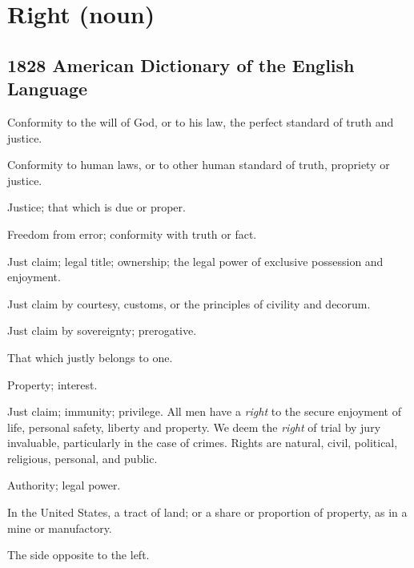 \section{Right (noun)}
	\label{RIGHT-NOUN}
	

\subsection{1828 American Dictionary of the English Language} %
	\label{RIGHT-NOUN-1828}

	\begin{compactitem}
		\item[1] Conformity to the will of God, or to his law, the perfect standard of truth and justice.
		\item[2] Conformity to human laws, or to other human standard of truth, propriety or justice.
		\item[3] Justice; that which is due or proper.
		\item[4] Freedom from error; conformity with truth or fact.
		\item[5] Just claim; legal title; ownership; the legal power of exclusive possession and enjoyment.
		\item[6] Just claim by courtesy, customs, or the principles of civility and decorum.
		\item[7] Just claim by sovereignty; prerogative. 
		\item[8] That which justly belongs to one.
		\item[9] Property; interest.
		\item[10] Just claim; immunity; privilege. All men have a \textit{right} to the secure enjoyment of life, personal safety, liberty and property. We deem the \textit{right} of trial by jury invaluable, particularly in the case of crimes. Rights are natural, civil, political, religious, personal, and public.
		\item[11] Authority; legal power.
		\item[12] In the United States, a tract of land; or a share or proportion of property, as in a mine or manufactory.
		\item[13] The side opposite to the left.
	\end{compactitem}

